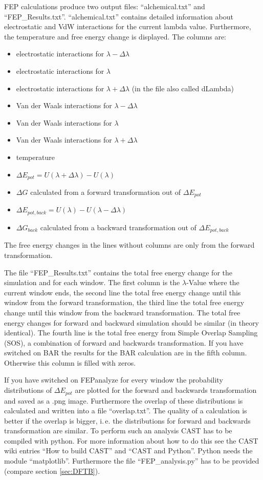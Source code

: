 \documentclass[10pt,a4paper]{article} %
\begin{document}
	\ac{FEP} calculations produce two output files: ``alchemical.txt'' and ``FEP\_Results.txt''. ``alchemical.txt'' contains detailed information about electrostatic and \ac{VdW} interactions for the current lambda value. Furthermore, the temperature and free energy change is displayed. The columns are:
	\begin{itemize}
	\item electrostatic interactions for $\lambda - \Delta \lambda$
	\item electrostatic interactions for $\lambda$
	\item electrostatic interactions for $\lambda + \Delta \lambda$ (in the file also called dLambda)
	\item Van der Waals interactions for $\lambda - \Delta \lambda$
	\item Van der Waals interactions for $\lambda$
	\item Van der Waals interactions for $\lambda + \Delta \lambda$ 
	\item temperature
	\item $\Delta E_{pot} = U(\lambda + \Delta \lambda) - U(\lambda)$
	\item $\Delta G$ calculated from a forward transformation out of $\Delta E_{pot}$
	\item $\Delta E_{pot, back} = U(\lambda) - U(\lambda - \Delta \lambda)$
	\item $\Delta G_{back}$ calculated from a backward transformation out of $\Delta E_{pot,back}$
	\end{itemize}
	The free energy changes in the lines without columns are only from the forward transformation.
	
	The file ``FEP\_Results.txt'' contains the total free energy change for the simulation and for each window. The first column is the $\lambda$-Value where the current window ends, the second line the total free energy change until this window from the forward transformation, the third line the total free energy change until this window from the backward transformation. The total free energy changes for forward and backward simulation should be similar (in theory identical). The fourth line is the total free energy from Simple Overlap Sampling (SOS), a combination of forward and backwards transformation. If you have switched on BAR the results for the BAR calculation are in the fifth column. Otherwise this column is filled with zeros.
	
	If you have switched on FEPanalyze for every window the probability distributions of $\Delta E_{pot}$ are plotted for the forward and backwards transformation and saved as a .png image. Furthermore the overlap of these distributions is calculated and written into a file ``overlap.txt''. The quality of a calculation is better if the overlap is bigger, i.\,e. the distributions for forward and backwards transformation are similar. To perform such an analysis CAST has to be compiled with python. For more information about how to do this see the CAST wiki entries ``How to build CAST'' and ``CAST and Python''. Python needs the module ``matplotlib''. Furthermore the file ``FEP\_analysis.py'' has to be provided (compare section \ref{sec:DFTB}). 
	
\end{document}
